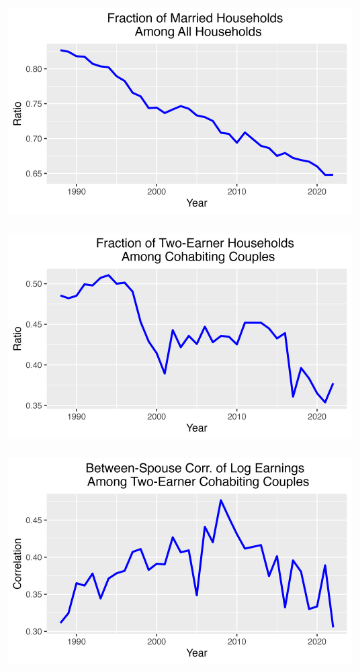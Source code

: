 \documentclass{article}
\begin{document}
\begin{figure}
\begin{subfigure}[t]{0.475\textwidth}
        \label{fig:Indi_to_HH_Var_single}
    \end{subfigure}
    \begin{subfigure}[t]{0.475\textwidth}
        \centering
        \includegraphics[width=\textwidth]{figures/Fig_3/Fig_3d_married_ratio.png}
        \label{fig:Indi_to_HH_married_ratio}
    \end{subfigure}
    \begin{subfigure}[t]{0.475\textwidth}
        \centering
        \includegraphics[width=\textwidth]{figures/Fig_3/Fig_3e_two_earner_ratio.png}
        \label{fig:Indi_to_HH_two_earner_ratio}
    \end{subfigure}
    \begin{subfigure}[t]{0.475\textwidth}
        \centering
        \includegraphics[width=\textwidth]{figures/Fig_3/Fig_3f_correlation.png}

\end{subfigure}
\end{figure}
\end{document}
